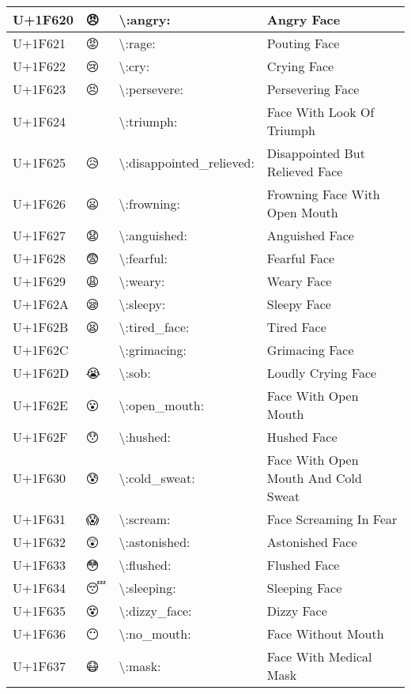 \begin{table}[h]
\begin{tabulary}{\linewidth}{|L|L|L|L|}
\hline
U+1F620 & 😠 & {\textbackslash}:angry: & Angry Face \\
\hline
U+1F621 & 😡 & {\textbackslash}:rage: & Pouting Face \\
\hline
U+1F622 & 😢 & {\textbackslash}:cry: & Crying Face \\
\hline
U+1F623 & 😣 & {\textbackslash}:persevere: & Persevering Face \\
\hline
U+1F624 & 😤 & {\textbackslash}:triumph: & Face With Look Of Triumph \\
\hline
U+1F625 & 😥 & {\textbackslash}:disappointed\_relieved: & Disappointed But Relieved Face \\
\hline
U+1F626 & 😦 & {\textbackslash}:frowning: & Frowning Face With Open Mouth \\
\hline
U+1F627 & 😧 & {\textbackslash}:anguished: & Anguished Face \\
\hline
U+1F628 & 😨 & {\textbackslash}:fearful: & Fearful Face \\
\hline
U+1F629 & 😩 & {\textbackslash}:weary: & Weary Face \\
\hline
U+1F62A & 😪 & {\textbackslash}:sleepy: & Sleepy Face \\
\hline
U+1F62B & 😫 & {\textbackslash}:tired\_face: & Tired Face \\
\hline
U+1F62C & 😬 & {\textbackslash}:grimacing: & Grimacing Face \\
\hline
U+1F62D & 😭 & {\textbackslash}:sob: & Loudly Crying Face \\
\hline
U+1F62E & 😮 & {\textbackslash}:open\_mouth: & Face With Open Mouth \\
\hline
U+1F62F & 😯 & {\textbackslash}:hushed: & Hushed Face \\
\hline
U+1F630 & 😰 & {\textbackslash}:cold\_sweat: & Face With Open Mouth And Cold Sweat \\
\hline
U+1F631 & 😱 & {\textbackslash}:scream: & Face Screaming In Fear \\
\hline
U+1F632 & 😲 & {\textbackslash}:astonished: & Astonished Face \\
\hline
U+1F633 & 😳 & {\textbackslash}:flushed: & Flushed Face \\
\hline
U+1F634 & 😴 & {\textbackslash}:sleeping: & Sleeping Face \\
\hline
U+1F635 & 😵 & {\textbackslash}:dizzy\_face: & Dizzy Face \\
\hline
U+1F636 & 😶 & {\textbackslash}:no\_mouth: & Face Without Mouth \\
\hline
U+1F637 & 😷 & {\textbackslash}:mask: & Face With Medical Mask \\

\end{tabulary}
\end{table}
